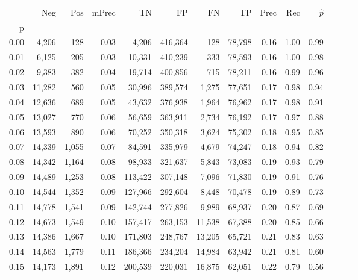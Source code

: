 \begin{tabular}{rrrrrrrrrrrrrr}
\toprule
{} &     Neg &    Pos & mPrec &       TN &       FP &      FN &      TP &  Prec &   Rec & $\hat{p}$ \\
p    &         &        &       &          &          &         &         &       &       &           \\
\midrule
0.00 &   4,206 &    128 &  0.03 &    4,206 &  416,364 &     128 &  78,798 &  0.16 &  1.00 &      0.99 \\
0.01 &   6,125 &    205 &  0.03 &   10,331 &  410,239 &     333 &  78,593 &  0.16 &  1.00 &      0.98 \\
0.02 &   9,383 &    382 &  0.04 &   19,714 &  400,856 &     715 &  78,211 &  0.16 &  0.99 &      0.96 \\
0.03 &  11,282 &    560 &  0.05 &   30,996 &  389,574 &   1,275 &  77,651 &  0.17 &  0.98 &      0.94 \\
0.04 &  12,636 &    689 &  0.05 &   43,632 &  376,938 &   1,964 &  76,962 &  0.17 &  0.98 &      0.91 \\
0.05 &  13,027 &    770 &  0.06 &   56,659 &  363,911 &   2,734 &  76,192 &  0.17 &  0.97 &      0.88 \\
0.06 &  13,593 &    890 &  0.06 &   70,252 &  350,318 &   3,624 &  75,302 &  0.18 &  0.95 &      0.85 \\
0.07 &  14,339 &  1,055 &  0.07 &   84,591 &  335,979 &   4,679 &  74,247 &  0.18 &  0.94 &      0.82 \\
0.08 &  14,342 &  1,164 &  0.08 &   98,933 &  321,637 &   5,843 &  73,083 &  0.19 &  0.93 &      0.79 \\
0.09 &  14,489 &  1,253 &  0.08 &  113,422 &  307,148 &   7,096 &  71,830 &  0.19 &  0.91 &      0.76 \\
0.10 &  14,544 &  1,352 &  0.09 &  127,966 &  292,604 &   8,448 &  70,478 &  0.19 &  0.89 &      0.73 \\
0.11 &  14,778 &  1,541 &  0.09 &  142,744 &  277,826 &   9,989 &  68,937 &  0.20 &  0.87 &      0.69 \\
0.12 &  14,673 &  1,549 &  0.10 &  157,417 &  263,153 &  11,538 &  67,388 &  0.20 &  0.85 &      0.66 \\
0.13 &  14,386 &  1,667 &  0.10 &  171,803 &  248,767 &  13,205 &  65,721 &  0.21 &  0.83 &      0.63 \\
0.14 &  14,563 &  1,779 &  0.11 &  186,366 &  234,204 &  14,984 &  63,942 &  0.21 &  0.81 &      0.60 \\
0.15 &  14,173 &  1,891 &  0.12 &  200,539 &  220,031 &  16,875 &  62,051 &  0.22 &  0.79 &      0.56 \\

\end{tabular}
